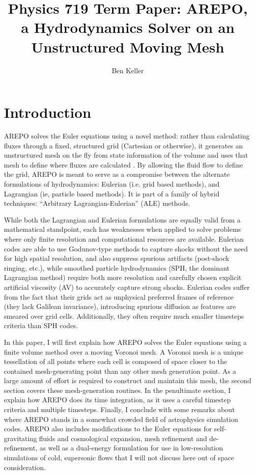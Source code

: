 \documentclass[12pt, preprint]{aastex}
\begin{document}
\title{Physics 719 Term Paper: AREPO, a Hydrodynamics Solver on an Unstructured
Moving Mesh}
\author{Ben Keller}
\maketitle
\newpage
\section{Introduction}
AREPO solves the Euler equations using a novel method: rather than calculating
fluxes through a fixed, structured grid (Cartesian or otherwise), it generates
an unstructured mesh on the fly from state information of the volume and
uses that mesh to define where fluxes are calculated \citep{springel2009}.  By
allowing the fluid flow to define the grid, AREPO is meant to serve as a
compromise between the alternate formulations of hydrodynamics: Eulerian (i.e.
grid based methods), and Lagrangian (ie, particle based methods).  It is part of
a family of hybrid techniques: ``Arbitrary Lagrangian-Eulerian'' (ALE) methods.

While both the Lagrangian and Eulerian formulations are equally valid from a
mathematical standpoint, each has weaknesses when applied to solve problems
where only finite resolution and computational resources are available. Eulerian
codes are able to use Godunov-type methods to capture shocks without the need
for high spatial resolution, and also suppress spurious artifacts (post-shock
ringing, etc.), while smoothed particle hydrodynamics (SPH, the dominant
Lagrangian method) require both more resolution and carefully chosen explicit
artificial viscosity (AV) to accurately capture strong shocks.  Eulerian codes
suffer from the fact that their grids act as unphysical preferred frames of
reference (they lack Galilean invariance), introducing spurious diffusion as
features are smeared over grid cells. Additionally, they often require much
smaller timesteps criteria than SPH codes.  

In this paper, I will first explain how AREPO solves the Euler equations using a
finite volume method over a moving Voronoi mesh.  A Voronoi mesh is a unique
tessellation of all points where each cell is composed of space closer to the
contained mesh-generating point than any other mesh generation point.  As a
large amount of effort is required to construct and maintain this mesh, the
second section covers these mesh-generation routines.  In the penultimate
section, I explain how AREPO does its time integration, as it uses a careful
timestep criteria and multiple timesteps. Finally, I conclude with
some remarks about where AREPO stands in a somewhat crowded field of
astrophysics simulation codes.  AREPO also includes modifications to the Euler
equations for self-gravitating fluids and cosmological expansion, mesh
refinement and de-refinement, as well as a dual-energy formulation for use in
low-resolution simulations of cold, supersonic flows that I will not discuss
here out of space consideration.
\end{document}
